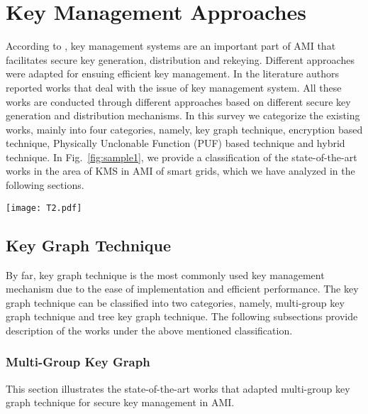 \section{Key Management Approaches}
According to \cite{Wan14}, key management systems are an important part of AMI that facilitates secure key generation, distribution and rekeying. Different approaches were adapted for ensuing efficient key management. In the literature authors reported works that deal with the issue of key management system. All these works are conducted through different approaches based on different secure key generation and distribution mechanisms. In this survey we categorize the existing works, mainly into four categories, namely, key graph technique, encryption based technique, Physically Unclonable Function (PUF) based technique and hybrid technique. In Fig.~\ref{fig:sample1}, we provide a classification of the state-of-the-art works in the area of KMS in AMI of smart grids, which we have analyzed in the following sections.   

\begin{figure*}
 \centering %
 \texttt{[image: T2.pdf]}
 \caption{Taxonomy for Key Management Approaches in AMI.}
 \label{fig:sample1}
\end{figure*}
\subsection{Key Graph Technique}

By far, key graph technique is the most commonly used key management mechanism due to the ease of implementation and efficient performance. The key graph technique can be classified into two categories, namely, multi-group key graph technique and tree key graph technique. The following subsections provide description of the works under the above mentioned classification. 

\subsubsection{Multi-Group Key Graph}
This section illustrates the state-of-the-art works that adapted multi-group key graph technique for secure key management in AMI. 

